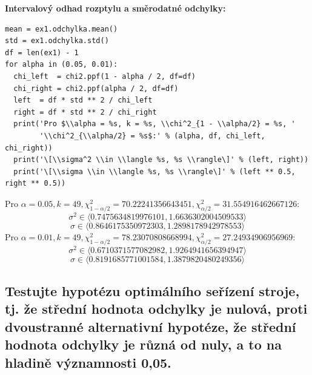 \documentclass[11pt,titlepage]{article}
\begin{document}
\textbf{Intervalový odhad rozptylu a směrodatné odchylky:}
\begin{listing}[htbp]
\begin{verbatim}
mean = ex1.odchylka.mean()
std = ex1.odchylka.std()
df = len(ex1) - 1
for alpha in (0.05, 0.01):
  chi_left  = chi2.ppf(1 - alpha / 2, df=df)
  chi_right = chi2.ppf(alpha / 2, df=df)
  left  = df * std ** 2 / chi_left
  right = df * std ** 2 / chi_right
  print('Pro $\\alpha = %s, k = %s, \\chi^2_{1 - \\alpha/2} = %s, '
        '\\chi^2_{\\alpha/2} = %s$:' % (alpha, df, chi_left, chi_right))
  print('\[\\sigma^2 \\in \\langle %s, %s \\rangle\]' % (left, right))
  print('\[\\sigma \\in \\langle %s, %s \\rangle\]' % (left ** 0.5, right ** 0.5))
\end{verbatim}
\end{listing}

Pro \(\alpha = 0.05, k = 49, \chi^2_{1 - \alpha/2} = 70.22241356643451, \chi^2_{\alpha/2} = 31.554916462667126\):
\[\sigma^2 \in \langle 0.7475634819976101, 1.6636302004509533 \rangle\]
\[\sigma \in \langle 0.8646175350972303, 1.2898178942978553 \rangle\]
Pro \(\alpha = 0.01, k = 49, \chi^2_{1 - \alpha/2} = 78.23070808668994, \chi^2_{\alpha/2} = 27.24934906956969\):
\[\sigma^2 \in \langle 0.6710371577082982, 1.9264941656394947 \rangle\]
\[\sigma \in \langle 0.8191685771001584, 1.3879820480249356 \rangle\]
\newpage
\subsection{Testujte hypotézu optimálního seřízení stroje, tj. že střední hodnota odchylky je nulová, proti dvoustranné alternativní hypotéze, že střední hodnota odchylky je různá od nuly, a to na hladině významnosti 0,05.}
\label{sec:org4b30f9e}
\end{document}
